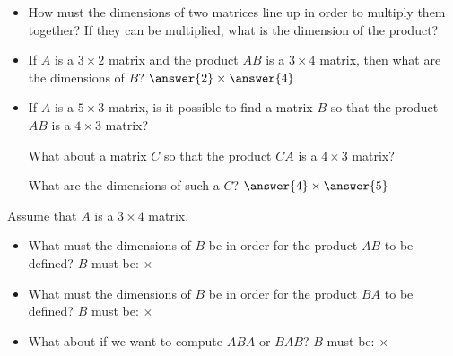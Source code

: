 \documentclass{ximera}
\begin{document}
\begin{exercise}
    \begin{itemize}
        \item How must the dimensions of two matrices line up in order to multiply them together? If they can be multiplied, what is the dimension of the product?
        \item If $A$ is a $3 \times 2$ matrix and the product $AB$ is a $3 \times 4$ matrix, then what are the dimensions of $B$? $\answer{2}\times\answer{4}$
        \item If $A$ is a $5 \times 3$ matrix, is it possible to find a matrix $B$ so that the product $AB$ is a $4 \times 3$ matrix? 
        \begin{multipleChoice}
        \end{multipleChoice}  
        \begin{problem}
            What about a matrix $C$ so that the product $CA$ is a $4 \times 3$ matrix?
            \begin{multipleChoice}
            \end{multipleChoice}  
            \begin{problem}
                What are the dimensions of such a $C$? $\answer{4}\times\answer{5}$
            \end{problem}
        \end{problem}
    \end{itemize}
\end{exercise}

\begin{exercise} \label{ex:MatDims}
    Assume that $A$ is a $3\times 4$ matrix.
    \begin{itemize}
        \item What must the dimensions of $B$ be in order for the product $AB$ to be defined? $B$ must be:  $\times$
        \item What must the dimensions of $B$ be in order for the product $BA$ to be defined? $B$ must be:  $\times$
        \item What about if we want to compute $ABA$ or $BAB$? $B$ must be: $\times$
    \end{itemize} 
\end{exercise}
\end{document}
